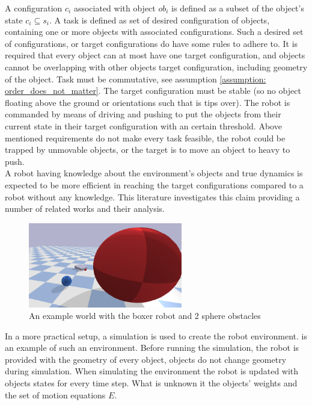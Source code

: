 A configuration $c_i$ associated with object $ob_i$ is defined as a subset of the object's state $c_i \subseteq s_i$. A task is defined as set of desired configuration of objects, containing one or more objects with associated configurations. Such a desired set of configurations, or target configurations do have some rules to adhere to. It is required that every object can at most have one target configuration, and objects cannot be overlapping with other objects target configuration, including geometry of the object. Task must be commutative, see assumption \ref{assumption: order_does_not_matter}. The target configuration must be stable (so no object floating above the ground or orientations such that is tips over). The robot  is commanded by means of driving and pushing to put the objects from their current state in their target configuration with an certain threshold. Above mentioned requirements do not make every task feasible, the robot could be trapped by unmovable objects, or the target is to move an object to heavy to push.\\

A robot having knowledge about the environment's objects and true dynamics is expected to be more efficient in reaching the target configurations compared to a robot without any knowledge. This literature investigates this claim providing a number of related works and their analysis. \\

\begin{figure}[H]
    \centering
    \includegraphics[width=0.6\textwidth]{figures/example_robot_world.png}
    \caption{An example world with the boxer robot and 2 sphere obstacles}
    \label{figure: example_world_intro}
\end{figure}

In a more practical setup, a simulation is used to create the robot environment.  is an example of such an environment. Before running the simulation, the robot is provided with the geometry of every object, objects do not change geometry during simulation. When simulating the environment the robot is updated with objects states for every time step. What is unknown it the objects' weights and the set of motion equations $E$. 

